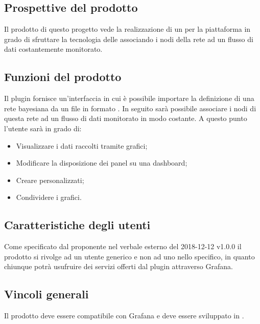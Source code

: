 
\subsection{Prospettive del prodotto}
Il prodotto di questo progetto vede la realizzazione di un  per la piattaforma  in grado di sfruttare la tecnologia delle  associando i nodi della rete ad un flusso di dati costantemente monitorato.

\subsection{Funzioni del prodotto}
Il plugin fornisce un'interfaccia in cui è possibile importare la definizione di una rete bayesiana da un file in formato . In seguito sarà possibile associare i nodi di questa rete ad un flusso di dati monitorato in modo costante. A questo punto l'utente sarà in grado di:
\begin{itemize}
	\item Visualizzare i dati raccolti tramite grafici;
	\item Modificare la disposizione dei panel su una dashboard;
	\item Creare  personalizzati;
	\item Condividere i grafici.
\end{itemize}

\subsection{Caratteristiche degli utenti}
Come specificato dal proponente nel verbale esterno del 2018-12-12 v1.0.0 il prodotto si rivolge ad un utente generico e non ad uno nello specifico, in quanto chiunque potrà usufruire dei servizi offerti dal plugin attraverso Grafana. 

\subsection{Vincoli generali}
Il prodotto deve essere compatibile con Grafana e deve essere sviluppato in .

\pagebreak